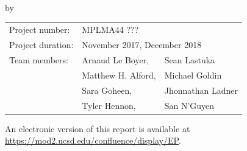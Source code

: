 \begin{titlepage}


\begin{center}


{\makeatletter
\largetitlestyle\fontsize{64}{94}\selectfont\@title
\makeatother}

{\makeatletter
\ifx\@subtitle\undefined\else
    \bigskip
   {\tudsffamily\fontsize{42}{42}\selectfont\@subtitle}    
\fi
\makeatother}

\bigskip
\bigskip

by

\bigskip
\bigskip

{\makeatletter
\largetitlestyle\fontsize{15}{15}\selectfont\@author
\makeatother}

\vfill

\begin{tabular}{lll}
    Project number: & MPLMA44 ??? \\
    Project duration: & \multicolumn{2}{l}{November 2017, December 2018} \\
    Team members: & Arnaud Le Boyer, & Sean Lastuka \\
        & Matthew H. Alford, & Michael Goldin \\
        & Sara Goheen, & Jhonnathan Ladner  \\
        & Tyler Hennon, & San N'Guyen
\end{tabular}

\bigskip

\bigskip
\bigskip
An electronic version of this report is available at \url{https://mod2.ucsd.edu/confluence/display/EP}.



\end{center}


\end{titlepage}

